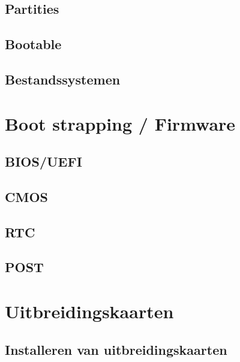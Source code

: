 \documentclass[a4paper,12pt,twoside,openright,titlepage]{book}
\begin{document}
\section{Partities}
\section{Bootable}
\section{Bestandssystemen}

\chapter{Boot strapping / Firmware}
\section{BIOS/UEFI}
\section{CMOS}

\section{RTC}
\section{POST}

\chapter{Uitbreidingskaarten}
\section{Installeren van uitbreidingskaarten}

\backmatter
\printindex
\end{document}
